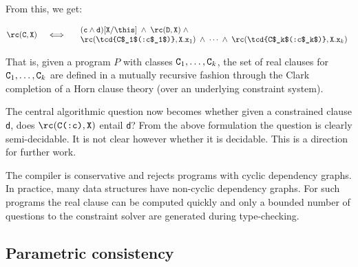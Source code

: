 \noindent From this, we get:

$$\rc({\tt C},{\tt X}) ~~~ \iff
\begin{array}{l}
\quad  ({\tt c} \wedge {\tt d})[{\tt X}/\this]
\;\wedge\; \rc({\tt D},{\tt X}) \;\wedge \\
\quad  \rc(\mbox{\tcd{C$_1$(:c$_1$)}}, {\tt X.x}_1) \;\wedge\; \cdots
\;\wedge\; \rc(\mbox{\tcd{C$_k$(:c$_k$)}}, {\tt X.x}_k)
\end{array}
$$

That is, given a program $P$ with classes ${\tt C}_1,\ldots, {\tt
C}_k$, the set of real clauses for ${\tt C}_1,\ldots, {\tt C}_k$ are
defined in a mutually recursive fashion through the Clark completion
of a Horn clause theory (over an underlying constraint system).

The central algorithmic question now becomes whether given a
constrained clause {\tt d}, does $\rc(\mbox{\tt C(:c)},{\tt X})$ entail {\tt d}? 
%
From the above formulation the question is clearly semi-decidable. It
is not clear however whether it is decidable. This is a direction for
further work.

The \Xten{} compiler is conservative and rejects
programs with cyclic dependency graphs.
%
In practice, many data structures have non-cyclic dependency
graphs. For such programs the real clause can be computed quickly and
only a bounded number of questions to the constraint solver are
generated during type-checking.


\subsection{Parametric consistency}

